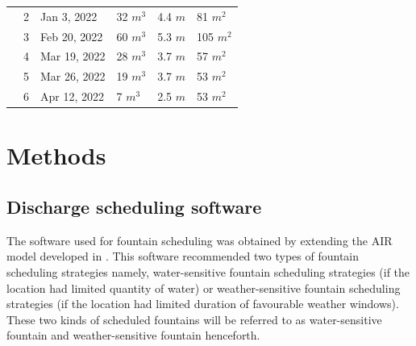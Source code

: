 \documentclass[tc, manuscript]{copernicus}
\begin{document}
\begin{table}
\begin{tabular}{@{}|llllll|@{}}
		\multicolumn{1}{|l|}{} & 2            & Jan 3, 2022   & 32 $m^{3}$      & 4.4 $m$
		                       & 81 $m^{2}$                                                                       \\
		\multicolumn{1}{|l|}{} & 3            & Feb 20, 2022   & 60 $m^{3}$      & 5.3 $m$
		                       & 105 $m^{2}$                                                                       \\
		\multicolumn{1}{|l|}{} & 4            & Mar 19, 2022   & 28 $m^{3}$      & 3.7 $m$
		                       & 57 $m^{2}$                                                                       \\
		\multicolumn{1}{|l|}{} & 5            & Mar 26, 2022   & 19 $m^{3}$      & 3.7 $m$
		                       & 53 $m^{2}$                                                                       \\
		\multicolumn{1}{|l|}{} & 6            & Apr 12, 2022   & 7 $m^{3}$      & 2.5 $m$
		                       & 53 $m^{2}$                                                                       \\
		\bottomrule
	\end{tabular}

\end{table}

\section{Methods}

\subsection{Discharge scheduling software}

The software used for fountain scheduling was obtained by extending the AIR model developed in
\cite{balasubramanianInfluenceMeteorologicalConditions2022}. This software recommended two types of fountain
scheduling strategies namely, water-sensitive fountain scheduling strategies (if the location had limited
quantity of water) or weather-sensitive fountain scheduling strategies (if the location had limited duration of
favourable weather windows). These two kinds of scheduled fountains will be referred to as water-sensitive
fountain and weather-sensitive fountain henceforth.
\end{document}
